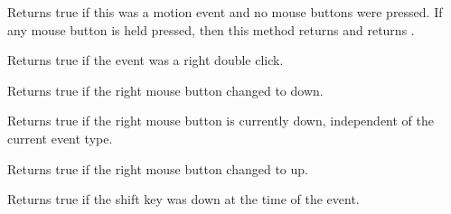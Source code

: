 Returns true if this was a motion event and no mouse buttons were pressed. 
If any mouse button is held pressed, then this method returns \false and 
 returns \true.


\label{wxmouseeventrightdclick}


Returns true if the event was a right double click.


\label{wxmouseeventrightdown}


Returns true if the right mouse button changed to down.


\label{wxmouseeventrightisdown}


Returns true if the right mouse button is currently down, independent
of the current event type.


\label{wxmouseeventrightup}


Returns true if the right mouse button changed to up.


\label{wxmouseeventshiftdown}


Returns true if the shift key was down at the time of the event.

